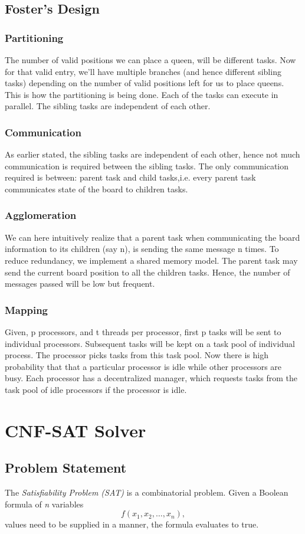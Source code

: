 \documentclass[a4paper]{article}
\begin{document}
\subsection*{Foster's Design}
\subsubsection*{Partitioning}
The number of valid positions we can place a queen, will be different tasks. Now for that valid entry, we'll have multiple branches (and hence different sibling tasks) depending on the number of valid positions left for us to place queens.  This is how the partitioning is being done. Each of the tasks can execute in parallel. The sibling tasks are independent of each other.
\subsubsection*{Communication}
As earlier stated, the sibling tasks are independent of each other, hence not much communication is required between the sibling tasks. The only communication required is between: parent task and child tasks,i.e. every parent task communicates state of the board to children tasks.
\subsubsection*{Agglomeration}
We can here intuitively realize that a parent task when communicating the board information to its children (say n), is sending the same message n times. To reduce redundancy, we implement a shared memory model. The parent task may send the current board position to all the children tasks. Hence, the number of messages passed will be low but frequent.
\subsubsection*{Mapping}
Given, p processors, and t threads per processor, first p tasks will be sent to individual processors. Subsequent tasks will be kept on a task pool of individual process. The processor picks tasks from this task pool. Now there is high probability that that a particular processor is idle while other processors are busy. Each processor has a decentralized manager, which requests tasks from the task pool of idle processors if the processor is idle.
\section{CNF-SAT Solver}
\subsection*{Problem Statement}
The \emph{Satisfiability Problem (SAT)} is a combinatorial problem. Given a Boolean formula of \emph{n} variables $$f(x_{1},x_{2},\dots,x_{n}),$$ values need to be supplied in a manner, the formula evaluates to true.
\end{document}
